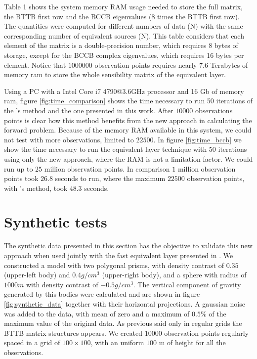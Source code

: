 \documentclass[paper]{geophysics}
\begin{document}
Table 1 shows the system memory RAM usage needed to store the full matrix, the BTTB first row and the BCCB eigenvalues ($8$ times the BTTB first row). The quantities were computed for different numbers of data (N) with the same corresponding number of equivalent sources (N). This table considers that each element of the matrix is a double-precision number, which requires 8 bytes of storage, except for the BCCB complex eigenvalues, which requires 16 bytes per element. Notice that $1000000$ observation points requires nearly $7.6$ Terabytes of memory ram to store the whole sensibility matrix of the equivalent layer.

Using a PC with a Intel Core i7 4790@3.6GHz processor and 16 Gb of memory ram, figure \ref{fig:time_comparison} shows the time necessary to run 50 iterations of the \cite{siqueira2017fast}'s method and the one presented in this work. After $10000$ observations points is clear how this method benefits from the new approach in calculating the forward problem. Because of the memory RAM available in this system, we could not test with more observations, limited to $22500$. In figure \ref{fig:time_bccb} we show the time necessary to run the equivalent layer technique with 50 iterations using only the new approach, where the RAM is not a limitation factor. We could run up to $25$ million observation points. In comparison $1$ million observation points took $26.8$ seconds to run, where the maximum $22500$ observation points, with \cite{siqueira2017fast}'s method, took $48.3$ seconds.

\section{Synthetic tests}
The synthetic data presented in this section has the objective to validate this new approach when used jointly with the fast equivalent layer presented in \cite{siqueira2017fast}. We constructed a model with two polygonal prisms, with density contrast of $0.35$ (upper-left body) and $0.4 g/cm^3$ (upper-right body), and a sphere with radius of $1000 m$ with density contrast of $-0.5 g/cm^3$. The vertical component of gravity generated by this bodies were calculated and are shown in figure \ref{fig:synthetic_data} together with their horizontal projections. A gaussian noise was added to the data, with mean of zero and a maximum of $0.5\%$ of the maximum value of the original data. As previous said only in regular grids the BTTB matrix structures appears. We created $10000$ observation points regularly spaced in a grid of $100 \times 100$, with an uniform $100$ m of height for all the observations.
\end{document}

